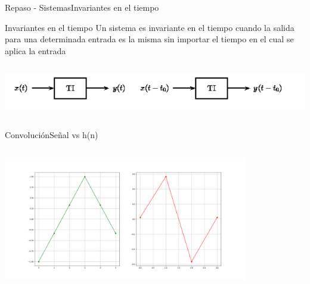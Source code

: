 \begin{frame}{Repaso - Sistemas}{Invariantes en el tiempo}
   \begin{block}{Invariantes en el tiempo}
      Un sistema es invariante en el tiempo cuando la salida para una determinada entrada es la misma sin importar el tiempo en el cual se aplica la entrada
   \end{block}
   \begin{columns}[onlytextwidth]
      \center\includegraphics[width=1\textwidth]{1_clase/invariante_en_tiempo} \\
   \end{columns}
   \vfill
\end{frame}
\begin{frame}{Convolución}{Señal vs h(n)}
   \begin{columns}[c]
      \begin{column}{1\textwidth}
         \centering\includegraphics[width=0.8\textwidth]{4_clase/signal_vs_h}
      \end{column}
   \end{columns}
   \vfill
\end{frame}
